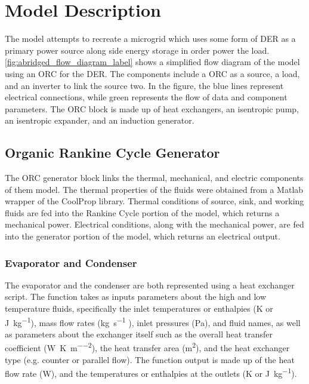 \chapter{Model Description}
\label{ch:model}

The model attempts to recreate a microgrid which uses some form of DER as a primary power source along side energy storage in order power the load. \autoref{fig:abridged_flow_diagram_label} shows a simplified flow diagram of the model using an ORC for the DER. The components include a ORC as a source, a load, and an inverter to link the source two. In the figure, the blue lines represent electrical connections, while green represents the flow of data and component parameters. The ORC block is made up of heat exchangers, an isentropic pump, an isentropic expander, and an induction generator. 
\begin{comment}
The load block \verb|one line description of load|. 
The energy storage block \verb|one line description of energy storage|. 
The inverter block \verb|one line description of inverter|.
\end{comment}


\section{Organic Rankine Cycle Generator}
The ORC generator block links the thermal, mechanical, and electric components of them model. The thermal properties of the fluids were obtained from a Matlab wrapper of the CoolProp library. \cite{Bell2014} Thermal conditions of source, sink, and working fluids are fed into the Rankine Cycle portion of the model, which returns a mechanical power. Electrical conditions, along with the mechanical power, are fed into the generator portion of the model, which returns an electrical output.  

\subsection{Evaporator and Condenser}
The evaporator and the condenser are both represented using a heat exchanger script.  The function takes as inputs parameters about the high and low temperature fluids, specifically the inlet temperatures or enthalpies (\si{\kelvin} or \si{\joule\per\kilogram}), mass flow rates (\si{\kilogram\per\second} ), inlet pressures (\si{\pascal}), and fluid names, as well as parameters about the exchanger itself such as the overall heat transfer coefficient (\si{\watt\per\kelvin\per\meter\squared}), the heat transfer area (\si{\meter\squared}), and the heat exchanger type (e.g. counter or parallel flow). The function output is made up of the heat flow rate (\si{\watt}), and the temperatures or enthalpies at the outlets (\si{\kelvin} or \si{\joule\per\kilogram}). 


